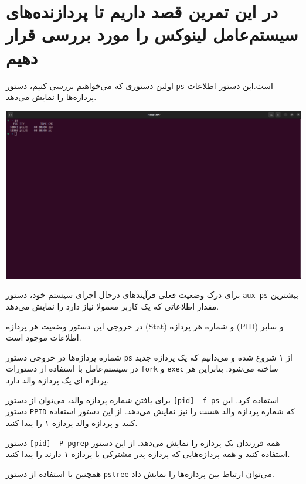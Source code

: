 \section{در این تمرین قصد داریم تا پردازنده‌های سیستم‌عامل لینوکس را مورد بررسی قرار دهیم}

اولین دستوری که می‌خواهیم بررسی کنیم، دستور \texttt{ps} است.این دستور اطلاعات پردازه‌ها را نمایش می‌دهد.
\begin{qsolve}
	\begin{center}
		\includegraphics[width=\textwidth]{pics/img1.png}
	\end{center}
\end{qsolve}

برای درک وضعیت فعلی فرآیند‌های درحال اجرای سیستم خود، دستور \texttt{aux ps} بیشترین مقدار اطلاعاتی که یک کاربر معمولا نیاز دارد را نمایش می‌دهد.

در خروجی این دستور وضعیت هر پردازه (Stat) و شماره هر پردازه (PID) و سایر اطلاعات موجود است.

شماره پردازه‌ها در خروجی دستور \texttt{ps} از ۱ شروع شده و می‌دانیم که یک پردازه جدید در سیستم‌عامل با استفاده از دستورات \texttt{fork} و \texttt{exec} ساخته می‌شود. بنابراین هر پردازه ای یک پردازه والد دارد.

برای یافتن شماره پردازه والد، می‌توان از دستور \texttt{[pid] -f ps} استفاده کرد. این دستور \texttt{PPID} که شماره پردازه والد هست را نیز نمایش می‌دهد. از این دستور استفاده کنید و پردازه والد پردازه ۱ را پیدا کنید.

دستور \texttt{[pid] -P pgrep} همه فرزندان یک پردازه را نمایش می‌دهد. از این دستور استفاده کنید و همه پردازه‌هایی که پردازه پدر مشترکی با پردازه ۱ دارند را پیدا کنید.

همچنین با استفاده از دستور \texttt{pstree} می‌توان ارتباط بین پردازه‌ها را نمایش داد.



